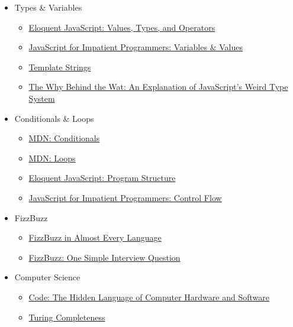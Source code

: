 \begin{itemize}
    \item Types \& Variables
        \begin{itemize}
            \item \href{https://eloquentjavascript.net/01_values.html}{Eloquent JavaScript: Values, Types, and Operators}
            \item \href{http://exploringjs.com/impatient-js/ch_variables-assignment.html}{JavaScript for Impatient Programmers: Variables \& Values}
            \item \href{https://developers.google.com/web/updates/2015/01/ES6-Template-Strings#string_substitution}{Template Strings}
            \item \href{https://medium.com/dailyjs/the-why-behind-the-wat-an-explanation-of-javascripts-weird-type-system-83b92879a8db}{The Why Behind the Wat: An Explanation of JavaScript's Weird Type System}
        \end{itemize}

    \item Conditionals \& Loops
        \begin{itemize}
            \item \href{https://developer.mozilla.org/en-US/docs/Learn/JavaScript/Building_blocks/conditionals}{MDN: Conditionals}
            \item \href{https://developer.mozilla.org/en-US/docs/Web/JavaScript/Guide/Loops_and_iteration}{MDN: Loops}
            \item \href{https://eloquentjavascript.net/02_program_structure.html}{Eloquent JavaScript: Program Structure}
            \item \href{http://exploringjs.com/impatient-js/ch_control-flow.html}{JavaScript for Impatient Programmers: Control Flow}
        \end{itemize}

    \item FizzBuzz
        \begin{itemize}
            \item \href{https://rosettacode.org/wiki/FizzBuzz}{FizzBuzz in Almost Every Language}
            \item \href{https://www.youtube.com/watch?v=QPZ0pIK_wsc}{FizzBuzz: One Simple Interview Question}
        \end{itemize}

    \item Computer Science
        \begin{itemize}
            \item \href{https://www.amazon.co.uk/Code-Language-Computer-Hardware-Software/dp/0735611319}{Code: The Hidden Language of Computer Hardware and Software}
            \item \href{https://en.wikipedia.org/wiki/Turing_completeness}{Turing Completeness}
        \end{itemize}
\end{itemize}
